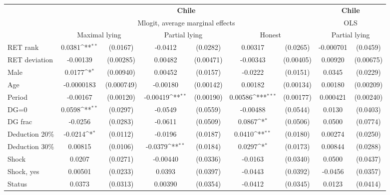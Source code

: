 \def\sym#1{\ifmmode^{#1}\else\(^{#1}\)\fi}
\begin{tabular}{l|cccccc|cc}
\hline\hline
&\multicolumn{6}{c|}{\bf Chile}&\multicolumn{2}{c}{\bf Chile}\\ &\multicolumn{6}{c|}{Mlogit, average marginal effects }&\multicolumn{2}{c}{OLS}\\
                &\multicolumn{2}{c}{Maximal lying}&\multicolumn{2}{c}{Partial lying}&\multicolumn{2}{c|}{Honest}  &\multicolumn{2}{c}{Partial lying}\\
\hline
RET rank        &   0.0381\sym{**} & (0.0167)&  -0.0412         & (0.0282)&  0.00317         & (0.0265)&-0.000701         & (0.0459)\\
RET deviation   & -0.00139         &(0.00285)&  0.00482         &(0.00471)& -0.00343         &(0.00405)&  0.00920         &(0.00675)\\
Male            &   0.0177\sym{*}  &(0.00940)&  0.00452         & (0.0157)&  -0.0222         & (0.0151)&   0.0345         & (0.0229)\\
Age             &-0.0000183         &(0.000749)& -0.00180         &(0.00142)&  0.00182         &(0.00134)&  0.00180         &(0.00209)\\
Period          & -0.00167         &(0.00120)& -0.00419\sym{**} &(0.00190)&  0.00586\sym{***}&(0.00177)& 0.000421         &(0.00240)\\
DG=0          &   0.0598\sym{**} & (0.0297)&  -0.0549         & (0.0559)& -0.00488         & (0.0544)&   0.0130         & (0.0403)\\
DG frac         &  -0.0256         & (0.0283)&  -0.0611         & (0.0509)&   0.0867\sym{*}  & (0.0506)&   0.0500         & (0.0774)\\
Deduction 20\%&  -0.0214\sym{*}  & (0.0112)&  -0.0196         & (0.0187)&   0.0410\sym{**} & (0.0180)&  0.00274         & (0.0250)\\
Deduction 30\%&  0.00815         & (0.0106)&  -0.0379\sym{**} & (0.0184)&   0.0297\sym{*}  & (0.0173)&  0.00844         & (0.0288)\\
Shock         &   0.0207         & (0.0271)& -0.00440         & (0.0336)&  -0.0163         & (0.0340)&   0.0500         & (0.0437)\\
Shock, yes    &  0.00501         & (0.0233)&   0.0393         & (0.0397)&  -0.0443         & (0.0392)&  -0.0456         & (0.0357)\\
Status        &   0.0373         & (0.0313)&  0.00390         & (0.0354)&  -0.0412         & (0.0345)&   0.0123         & (0.0414)\\

\end{tabular}
